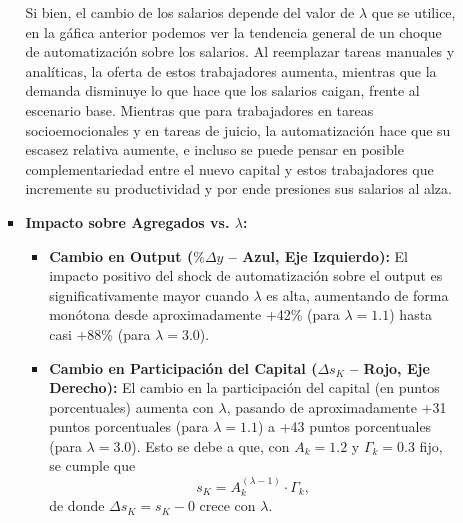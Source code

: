 \documentclass{article}
\theoremstyle{remark}
\theoremstyle{definition}
\begin{document}
\begin{enumerate}
\begin{tcolorbox}[title= Soluci\'on 5]
\begin{itemize}
\begin{itemize}
                    Si bien, el cambio de los salarios depende del valor de $\lambda$ que se utilice, en la g\'afica anterior podemos ver la tendencia general de un choque de automatizaci\'on sobre los salarios. Al reemplazar tareas manuales y anal\'iticas, la oferta de estos trabajadores aumenta, mientras que la demanda disminuye lo que hace que los salarios caigan, frente al escenario base. Mientras que para trabajadores en tareas socioemocionales y en tareas de juicio, la automatizaci\'on hace que su escasez relativa aumente, e incluso se puede pensar en posible complementariedad entre el nuevo capital y estos trabajadores que incremente su productividad y por ende presiones sus salarios al alza.
        
      \item \textbf{Impacto sobre Agregados vs. \(\lambda\):}
        \begin{itemize}
          \item \textbf{Cambio en Output (\(\%\Delta y\) – Azul, Eje Izquierdo):} El impacto positivo del shock de automatizaci\'on sobre el output es significativamente mayor cuando \(\lambda\) es alta, aumentando de forma monótona desde aproximadamente +42\% (para \(\lambda=1.1\)) hasta casi +88\% (para \(\lambda=3.0\)).
          \item \textbf{Cambio en Participación del Capital (\(\Delta s_K\) – Rojo, Eje Derecho):} El cambio en la participación del capital (en puntos porcentuales) aumenta con \(\lambda\), pasando de aproximadamente +31 puntos porcentuales (para \(\lambda=1.1\)) a +43 puntos porcentuales (para \(\lambda=3.0\)). Esto se debe a que, con \(A_k=1.2\) y \(\Gamma_k=0.3\) fijo, se cumple que
            \[
            s_K = A_k^{(\lambda-1)}\cdot \Gamma_k,
            \]
            de donde \(\Delta s_K = s_K - 0\) crece con \(\lambda\).
        \end{itemize}
    \end{itemize}


\end{itemize}
\end{tcolorbox}
\end{enumerate}
\end{document}
